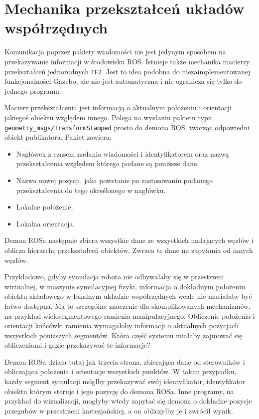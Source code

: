 \section{Mechanika przekształceń układów współrzędnych}
	\label{sec:frames}
	Komunikacja poprzez pakiety wiadomości nie jest jedynym sposobem na przekazywanie informacji w środowisku ROS.
	Istnieje także mechanika macierzy przekształceń jednorodnych \texttt{TF2}.
	Jest to idea podobna do niezaimplementowanej funkcjonalności Gazebo, ale nie jest automatyczna i nie ogranicza się tylko do jednego programu.
	
	Macierz przekształcenia jest informacją o aktualnym położeniu i orientacji jakiegoś obiektu względem innego.
	Polega na wysłaniu pakietu typu \texttt{geometry\_msgs/TransformStamped} prosto do demona ROS, tworząc odpowiedni obiekt publikatora.
	Pakiet zawiera:
	\begin{itemize}
		\item Nagłówek z czasem nadania wiadomości i identyfikatorem oraz nazwą przekształcenia względem którego podane są poniższe dane.
		\item Nazwa nowej pozycji, jaka powstanie po zastosowaniu podanego przekształcenia do tego określonego w nagłówku.
		\item Lokalne położenie.
		\item Lokalna orientacja.
	\end{itemize}
	Demon ROSa następnie zbiera wszystkie dane ze wszystkich nadających węzłów i oblicza hierarchę przekształceń obiektów.
	Zwraca te dane na zapytania od innych węzłów.
	
	Przykładowo, gdyby symulacja robota nie odbywałaby się w przestrzeni wirtualnej, w maszynie symulacyjnej fizyki, 
	informacja o dokładnym położeniu obiektu składowego w lokalnym układzie współrzędnych wcale nie musiałaby być łatwo dostępna.
	Ma to szczególne znaczenie dla skomplikowanych mechanizmów, na przykład wielosegmentowego ramienia manipulacyjnego.
	Obliczenie położenia i orientacji końcówki ramienia wymagałoby informacji o aktualnych pozycjach wszystkich poniższych segmentów.
	Która część systemu miałaby zajmować się obliczeniami i gdzie przekazywać te informacje?
	
	Demon ROSa działa tutaj jak trzecia strona, zbierająca dane od sterowników i obliczająca położenia i orientacje wszystkich punktów.
	W takim przypadku, każdy segment symulacji mógłby przekazywać swój identyfikator, identyfikator obiektu którym steruje i jego pozycję do demona ROSa.
	Inne programy, na przykład do wizualizacji, mogłyby wtedy zapytać się demona o dokładne pozycje przegubów w przestrzeni kartezjańskiej, a on obliczyłby je i zwrócił wynik.
	
